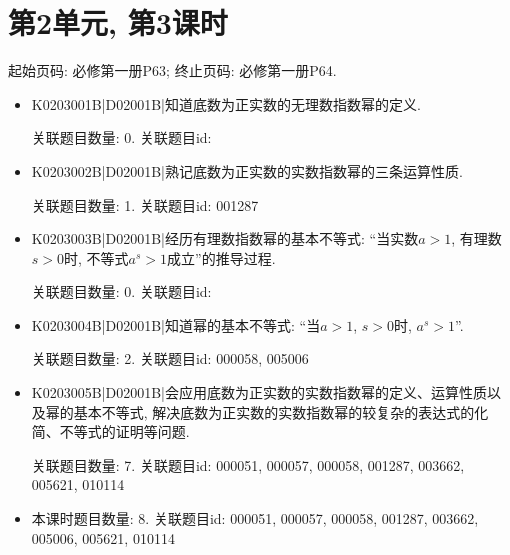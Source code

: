 \section*{第2单元, 第3课时}
起始页码: 必修第一册P63; 终止页码: 必修第一册P64.
\begin{itemize}
\item K0203001B|D02001B|知道底数为正实数的无理数指数幂的定义.

关联题目数量: 0. 关联题目id: 

\item K0203002B|D02001B|熟记底数为正实数的实数指数幂的三条运算性质.

关联题目数量: 1. 关联题目id: 001287

\item K0203003B|D02001B|经历有理数指数幂的基本不等式: ``当实数$a>1$, 有理数$s>0$时, 不等式$a^s>1$成立''的推导过程.

关联题目数量: 0. 关联题目id: 

\item K0203004B|D02001B|知道幂的基本不等式: ``当$a>1$, $s>0$时, $a^s>1$''.

关联题目数量: 2. 关联题目id: 000058, 005006

\item K0203005B|D02001B|会应用底数为正实数的实数指数幂的定义、运算性质以及幂的基本不等式, 解决底数为正实数的实数指数幂的较复杂的表达式的化简、不等式的证明等问题.

关联题目数量: 7. 关联题目id: 000051, 000057, 000058, 001287, 003662, 005621, 010114

\item 本课时题目数量: 8. 关联题目id: 000051, 000057, 000058, 001287, 003662, 005006, 005621, 010114

\end{itemize}

